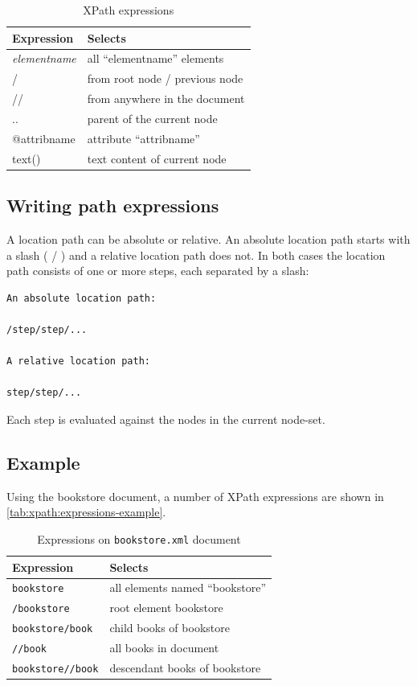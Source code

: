 \documentclass{pgnotes}
\begin{document}
\begin{table}[htbp]
  \centering
  \begin{tabular}{l l}
    \toprule
    \textbf{Expression} & \textbf{Selects} \\
    \midrule
    \textit{elementname} &  all ``elementname'' elements\\
    / & from root node / previous node \\
    // & from anywhere in the document \\
    .. & parent of the current node \\
    @attribname & attribute ``attribname'' \\
    text() & text content of current node\\
    \bottomrule
  \end{tabular}
  \caption{XPath expressions}
  \label{tab:xpath-expressions}
\end{table}

\subsection{Writing path expressions}

A location path can be absolute or relative.
An absolute location path starts with a slash ( / ) and a relative location path does not.
In both cases the location path consists of one or more steps, each separated by a slash:

\begin{verbatim}
An absolute location path:

/step/step/...

A relative location path:

step/step/...
\end{verbatim}

Each step is evaluated against the nodes in the current node-set.


\subsection{Example}

Using the bookstore document, a number of XPath expressions are shown in \autoref{tab:xpath:expressions-example}. 

\begin{table}[htbp]
  \centering
  \begin{tabular}{l l}
    \toprule
    \textbf{Expression} & \textbf{Selects} \\
    \midrule
    \texttt{bookstore} & all elements named ``bookstore'' \\
    \texttt{/bookstore} & root element bookstore \\
    \texttt{bookstore/book} & child books of bookstore \\
    \texttt{//book} & all books in document \\
    \texttt{bookstore//book} & descendant books of bookstore\\
    \bottomrule
  \end{tabular}
  \caption{Expressions on \texttt{bookstore.xml} document}
  \label{tab:xpath:expressions-example}
\end{table}
\end{document}
